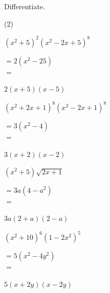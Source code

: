 \clearpage

Differentiate.\\
\begin{tasks}[start=1](2)
    \task \begin{exercise}$(x^2+5)^2 (x^2-2x+5)^8$
              \begin{envSolution}
                 $ =2(x^2-25)   $\\ 
                 $ =$			 
                     \begin{shortsolution}
  	                    $ 2(x+5)(x-5)$
                     \end{shortsolution}
              \end{envSolution}%
          \end{exercise}
 
    \task \begin{exercise}$(x^2+2x+1)^8 (x^2-2x+1)^8$
              \begin{envSolution}
                 $ =3(x^2-4)   $\\ 
                 $ =$			 
                     \begin{shortsolution}
  	                    $ 3(x+2)(x-2)$
                     \end{shortsolution}
              \end{envSolution}%
          \end{exercise}
 
    \task \begin{exercise}$(x^2+5)\sqrt{2x+1}$
              \begin{envSolution}
                 $ =3a(4-a^2)   $\\ 
                 $ =$			 
                     \begin{shortsolution}
  	                    $ 3a(2+a)(2-a)$
                     \end{shortsolution}
              \end{envSolution}%
          \end{exercise}

    \task \begin{exercise}$(x^2+10)^6 (1-2x^2)^5$
              \begin{envSolution}
                 $ =5(x^2-4y^2)   $\\
                 $ =$			 
                     \begin{shortsolution}
  	                    $ 5(x+2y)(x-2y)$
                     \end{shortsolution}
              \end{envSolution}%
          \end{exercise}
\end{tasks}



